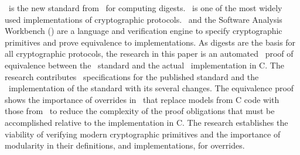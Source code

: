 \shaThree\ is the new standard from \nist\ for computing digests. 
\openssl\ is one of the most widely used implementations of cryptographic protocols.
\cryptol\ and the Software Analysis Workbench (\saw) are a language and verification engine to specify cryptographic primitives and prove equivalence to implementations.
As digests are the basis for all cryptographic protocols, the research in this paper is an automated \saw\ proof of equivalence between the \shaThree\ standard and the actual \openssl\ implementation in C.
The research contributes \cryptol\ specifications for the published standard and the \openssl\ implementation of the standard with its several changes.
The equivalence proof shows the importance of overrides in \saw\ that replace models from C code with those from \cryptol\ to reduce the complexity of the proof obligations that must be accomplished relative to the implementation in C.
The research establishes the viability of verifying modern cryptographic primitives and the importance of modularity in their definitions, and implementations, for overrides.

